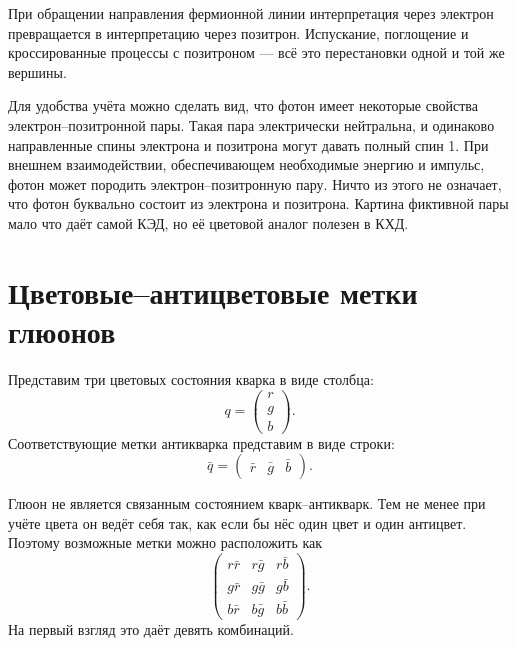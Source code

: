 При обращении направления фермионной линии интерпретация через электрон превращается в интерпретацию через позитрон. Испускание, поглощение и кроссированные процессы с позитроном — всё это перестановки одной и той же вершины.

Для удобства учёта можно сделать вид, что фотон имеет некоторые свойства электрон--позитронной пары. Такая пара электрически нейтральна, и одинаково направленные спины электрона и позитрона могут давать полный спин 1. При внешнем взаимодействии, обеспечивающем необходимые энергию и импульс, фотон может породить электрон--позитронную пару. Ничто из этого не означает, что фотон буквально состоит из электрона и позитрона. Картина фиктивной пары мало что даёт самой КЭД, но её цветовой аналог полезен в КХД.

\section{Цветовые--антицветовые метки глюонов}

Представим три цветовых состояния кварка в виде столбца:
\begin{equation}
q=
\begin{pmatrix}
r\\
g\\
b
\end{pmatrix}.
\end{equation}
Соответствующие метки антикварка представим в виде строки:
\begin{equation}
\bar q=
\begin{pmatrix}
\bar r&\bar g&\bar b
\end{pmatrix}.
\end{equation}

Глюон не является связанным состоянием кварк--антикварк. Тем не менее при учёте цвета он ведёт себя так, как если бы нёс один цвет и один антицвет. Поэтому возможные метки можно расположить как
\begin{equation}
\begin{pmatrix}
r\bar r&r\bar g&r\bar b\\
g\bar r&g\bar g&g\bar b\\
b\bar r&b\bar g&b\bar b
\end{pmatrix}.
\end{equation}
На первый взгляд это даёт девять комбинаций.

\begin{classroomqa}
\end{classroomqa}

